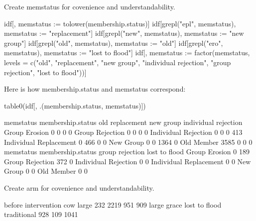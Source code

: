 Create \textsf{memstatus} for covenience and understandability.
\begin{Schunk}
\begin{Sinput}
idf[, memstatus := tolower(membership.status)]
idf[grepl("epl", memstatus), memstatus := "replacement"]
idf[grepl("new", memstatus), memstatus := "new group"]
idf[grepl("old", memstatus), memstatus := "old"]
idf[grepl("ero", memstatus), memstatus := "lost to flood"]
idf[, memstatus := factor(memstatus, levels = 
	c("old", "replacement", "new group", "individual rejection", 
	"group rejection", "lost to flood"))]
\end{Sinput}
\end{Schunk}
Here is how \textsf{membership.status} and \textsf{memstatus} correspond:
\begin{Schunk}
\begin{Sinput}
table0(idf[, .(membership.status, memstatus)])
\end{Sinput}
\begin{Soutput}
                        memstatus
membership.status         old replacement new group individual rejection
  Group Erosion             0           0         0                    0
  Group Rejection           0           0         0                    0
  Individual Rejection      0           0         0                  413
  Individual Replacement    0         466         0                    0
  New Group                 0           0      1364                    0
  Old Member             3585           0         0                    0
                        memstatus
membership.status        group rejection lost to flood
  Group Erosion                        0           189
  Group Rejection                    372             0
  Individual Rejection                 0             0
  Individual Replacement               0             0
  New Group                            0             0
  Old Member                           0             0
\end{Soutput}
\end{Schunk}
Create \textsf{arm} for covenience and understandability.
\begin{Schunk}
\begin{Soutput}

                    before intervention                 cow               large 
                232                2219                 951                 909 
        large grace       lost to flood         traditional 
                928                 109                1041 
\end{Soutput}
\end{Schunk}
